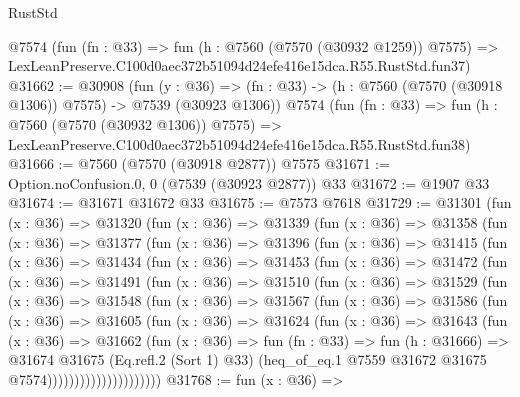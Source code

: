 \begin{lexlean}{RustStd}
\begin{coremodule}
    @7574
    (fun (fn : @33) =>
    fun (h : @7560 (@7570 (@30932 @1259)) @7575) =>
    LexLeanPreserve.C100d0aec372b51094d24efe416e15dca.R55.RustStd.fun37)
@31662 := @30908
    (fun (y : @36) =>
    (fn : @33) -> (h : @7560 (@7570 (@30918 @1306)) @7575) -> @7539 (@30923 @1306))
    @7574
    (fun (fn : @33) =>
    fun (h : @7560 (@7570 (@30932 @1306)) @7575) =>
    LexLeanPreserve.C100d0aec372b51094d24efe416e15dca.R55.RustStd.fun38)
@31666 := @7560 (@7570 (@30918 @2877)) @7575
@31671 := Option.noConfusion.{0, 0} (@7539 (@30923 @2877)) @33
@31672 := @1907 @33
@31674 := @31671 @31672 @33
@31675 := @7573 @7618
@31729 := @31301
    (fun (x : @36) =>
    @31320
      (fun (x : @36) =>
      @31339
        (fun (x : @36) =>
        @31358
          (fun (x : @36) =>
          @31377
            (fun (x : @36) =>
            @31396
              (fun (x : @36) =>
              @31415
                (fun (x : @36) =>
                @31434
                  (fun (x : @36) =>
                  @31453
                    (fun (x : @36) =>
                    @31472
                      (fun (x : @36) =>
                      @31491
                        (fun (x : @36) =>
                        @31510
                          (fun (x : @36) =>
                          @31529
                            (fun (x : @36) =>
                            @31548
                              (fun (x : @36) =>
                              @31567
                                (fun (x : @36) =>
                                @31586
                                  (fun (x : @36) =>
                                  @31605
                                    (fun (x : @36) =>
                                    @31624
                                      (fun (x : @36) =>
                                      @31643
                                        (fun (x : @36) =>
                                        @31662
                                          (fun (x : @36) =>
                                          fun (fn : @33) =>
                                          fun (h : @31666) =>
                                          @31674
                                            @31675
                                            (Eq.refl.{2} (Sort 1) @33)
                                            (heq_of_eq.{1}
                                              @7559
                                              @31672
                                              @31675
                                              @7574)))))))))))))))))))))
@31768 := fun (x : @36) =>

\end{coremodule}
\end{lexlean}
